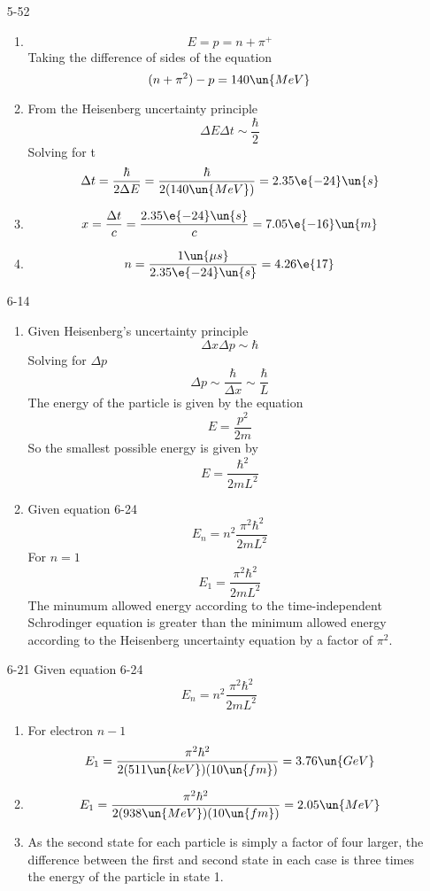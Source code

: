 \documentclass[]{2620hw}
\begin{document}
\maketitle
\begin{enumerate}
    
\item [5-52] 
\begin{enumerate}
	\item 
	\[
		E = p = n + \pi^+
	\]
	Taking the difference of sides of the equation
	\[
		(n + \pi^2) - p = 140 \un{MeV}	
	\]
	\item From the Heisenberg uncertainty principle
	\[
		\Delta E \Delta t \sim \frac{\hbar}{2}
	\]
	Solving for t
	\[
		\Delta t = \frac{\hbar}{2\Delta E} =  \frac{\hbar}{2(140 \un{MeV})} = 2.35 \e{-24}\un{s}
	\]
	\item 
	\[
		x = \frac{\Delta t}{c} = \frac{2.35 \e{-24}\un{s}}{c} = 7.05 \e{-16}\un{m}
	\]
	\item 
	\[
		n = \frac{1\un{\mu s}}{2.35 \e{-24}\un{s}} = 4.26 \e{17}
	\]
	
\end{enumerate}
	
\item [6-14]
\begin{enumerate}
	\item Given Heisenberg's uncertainty principle
	\[
		\Delta x \Delta p \sim \hbar
	\]
	Solving for $\Delta p$
	\[
		\Delta p \sim \frac{\hbar}{\Delta x} \sim \frac{\hbar}{L}
	\]
	The energy of the particle is given by the equation
	\[
		E = \frac{p^2}{2m}
	\]
	So the smallest possible energy is given by 
	\[
		E = \frac{\hbar^2}{2mL^2}
	\]
	\item Given equation 6-24
	\[
		E_n = n^2 \frac{\pi^2 \hbar^2}{2mL^2}
	\]
	For $n=1$
	\[
		E_1 = \frac{\pi^2 \hbar^2}{2mL^2}
	\]
	The minumum allowed energy according to the time-independent Schrodinger equation is greater than the minimum allowed energy according to the Heisenberg uncertainty equation by a factor of $\pi^2$.
\end{enumerate}

\item [6-21]
	Given equation 6-24
	\[
		E_n = n^2 \frac{\pi^2 \hbar^2}{2mL^2}
	\]
\begin{enumerate}
	\item For electron $n-1$
	\[
		E_1 = \frac{\pi^2 \hbar^2}{2(511\un{keV})(10\un{fm})} = 3.76 \un{GeV}
	\]
	\item 
	\[
		E_1 = \frac{\pi^2 \hbar^2}{2(938\un{MeV})(10\un{fm})} = 2.05 \un{MeV}
	\]
	\item As the second state for each particle is simply a factor of four larger, the difference between the first and second state in each case is three times the energy of the particle in state 1.
	

\end{enumerate}
\end{enumerate}
\end{document}
